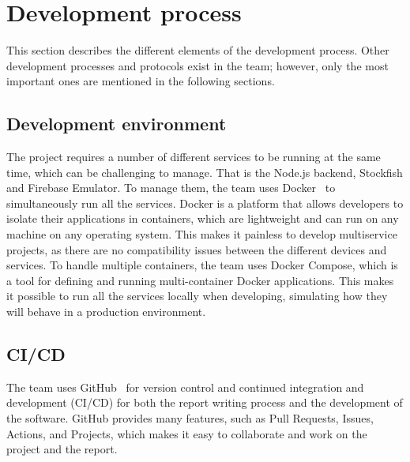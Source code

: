 \section{Development process}\label{sec:development-process}

This section describes the different elements of the development process.
Other development processes and protocols exist in the team; however, only the most important ones are mentioned in the
following sections.


\subsection{Development environment}\label{subsec:development-environment}

The project requires a number of different services to be running at the same time, which can be challenging to manage.
That is the Node.js backend, Stockfish and Firebase Emulator.
To manage them, the team uses Docker~\cite{docker} to simultaneously run all the services.
Docker is a platform that allows developers to isolate their applications in containers, which are lightweight and can
run on any machine on any operating system.
This makes it painless to develop multiservice projects, as there are no compatibility issues between the different
devices and services.
To handle multiple containers, the team uses Docker Compose, which is a tool for defining and running multi-container
Docker applications.
This makes it possible to run all the services locally when developing, simulating how they will behave in a production
environment.


\subsection{CI/CD}\label{subsec:ci/cd}

The team uses GitHub~\cite{github} for version control and continued integration and development (CI/CD) for both the
report writing process and the development of the software.
GitHub provides many features, such as Pull Requests, Issues, Actions, and Projects, which makes it easy to collaborate
and work on the project and the report.

